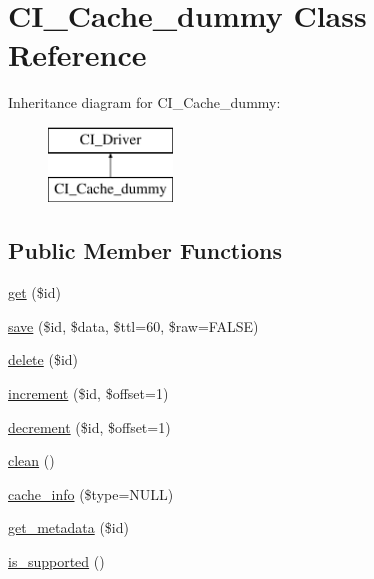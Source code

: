 \hypertarget{class_c_i___cache__dummy}{}\section{C\+I\+\_\+\+Cache\+\_\+dummy Class Reference}
\label{class_c_i___cache__dummy}
Inheritance diagram for C\+I\+\_\+\+Cache\+\_\+dummy\+:\begin{figure}[H]
\begin{center}
\leavevmode
\includegraphics[height=2.000000cm]{class_c_i___cache__dummy}
\end{center}
\end{figure}
\subsection*{Public Member Functions}
\begin{DoxyCompactItemize}
\item 
\mbox{\hyperlink{class_c_i___cache__dummy_ad83f249353ef5fe1aae7519d32ffa436}{get}} (\$id)
\item 
\mbox{\hyperlink{class_c_i___cache__dummy_a5b5d58b1842d33b79363e4f4da24dbf2}{save}} (\$id, \$data, \$ttl=60, \$raw=F\+A\+L\+SE)
\item 
\mbox{\hyperlink{class_c_i___cache__dummy_a8facf3a34546f4284085f68916a10ba4}{delete}} (\$id)
\item 
\mbox{\hyperlink{class_c_i___cache__dummy_a6979b8f31c503e6cc4e7c95fd1b2406c}{increment}} (\$id, \$offset=1)
\item 
\mbox{\hyperlink{class_c_i___cache__dummy_a7651c44e7e75dcfc400b0ef88e7f6bf0}{decrement}} (\$id, \$offset=1)
\item 
\mbox{\hyperlink{class_c_i___cache__dummy_a8a103d7c67427bdc5a29774af921cc0a}{clean}} ()
\item 
\mbox{\hyperlink{class_c_i___cache__dummy_a18b7eb603cd5a9953f76f25e99691a8f}{cache\+\_\+info}} (\$type=N\+U\+LL)
\item 
\mbox{\hyperlink{class_c_i___cache__dummy_affc9022795c57f2e9eba2cf3a9708cab}{get\+\_\+metadata}} (\$id)
\item 
\mbox{\hyperlink{class_c_i___cache__dummy_afa3bacf1085768a6bd94161b2b87a24e}{is\+\_\+supported}} ()
\end{DoxyCompactItemize}
